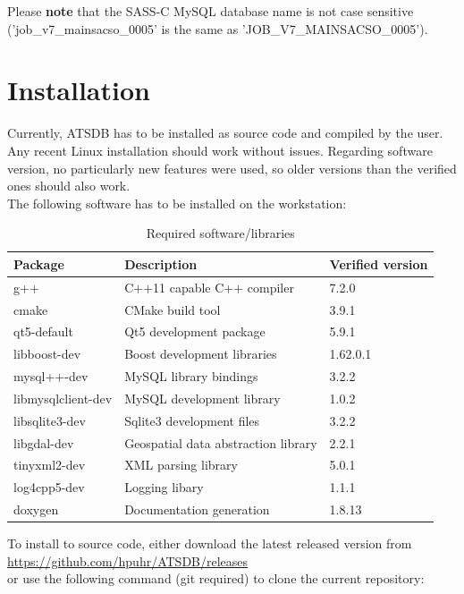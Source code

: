 \documentclass[10pt,letterpaper,extrafontsizes]{memoir}
\begin{document}
Please \textbf{note} that the SASS-C MySQL database name is not case sensitive ('job\_v7\_mainsacso\_0005' is the same as 'JOB\_V7\_MAINSACSO\_0005').

\chapter{Installation}
\label{sec:installation}

Currently, ATSDB has to be installed as source code and compiled by the user. Any recent Linux installation should work without issues. Regarding software version, no particularly new features were used, so older versions than the verified ones should also work. \\

The following software has to be installed on the workstation:

\begin{table}[H]
  \center
  \begin{tabular}{ | l | l | l |}
    \hline
    \textbf{Package} & \textbf{Description} & \textbf{Verified version} \\ \hline
    g++ & C++11 capable C++ compiler & 7.2.0 \\ \hline
    cmake & CMake build tool & 3.9.1 \\ \hline
    qt5-default & Qt5 development package & 5.9.1 \\ \hline
    libboost-dev & Boost development libraries & 1.62.0.1 \\ \hline
    mysql++-dev & MySQL library bindings & 3.2.2 \\ \hline
    libmysqlclient-dev & MySQL development library & 1.0.2 \\ \hline
    libsqlite3-dev & Sqlite3 development files & 3.2.2 \\ \hline
    libgdal-dev & Geospatial data abstraction library & 2.2.1 \\ \hline
    tinyxml2-dev & XML parsing library & 5.0.1 \\ \hline
    log4cpp5-dev & Logging libary & 1.1.1 \\ \hline
    doxygen & Documentation generation & 1.8.13 \\ 
    \hline
  \end{tabular}
  \caption{Required software/libraries}
\end{table}

To install to source code, either download the latest released version from \\ \url{https://github.com/hpuhr/ATSDB/releases} \\
or use the following command (git required) to clone the current repository:
\end{document}
